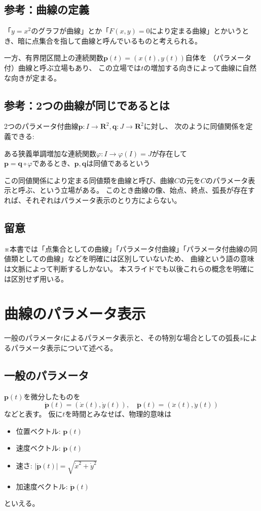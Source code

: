 \documentclass[a4j,disablejfam,dvipdfmx,papersize,slide,uplatex,21pt]{jsarticle}
\begin{document}
\newpage
\subsection*{参考：曲線の定義}
「$y=x^2$のグラフが曲線」とか「$F(x,y)=0$により定まる曲線」とかいうとき、暗に点集合を指して曲線と呼んでいるものと考えられる。

一方、有界閉区間上の連続関数$\bm{p}(t) = (x(t), y(t))$自体を
（パラメータ付）曲線と呼ぶ立場もあり\cite{kaiseki1}、
この立場では$t$の増加する向きによって曲線に自然な向きが定まる。

\newpage
\subsection*{参考：2つの曲線が同じであるとは}
2つのパラメータ付曲線$\bm{p}: I \rightarrow \mathbf{R}^2, \bm{q}: J \rightarrow \mathbf{R}^2$に対し、
次のように同値関係を定義できる:
\begin{center}
    ある狭義単調増加な連続関数$\varphi: I \rightarrow \varphi(I) = J$が存在して\\
    $\bm{p} = \bm{q} \circ \varphi$であるとき、$\bm{p}, \bm{q}$は同値であるという
\end{center}
この同値関係により定まる同値類を曲線と呼び、曲線$C$の元を$C$のパラメータ表示と呼ぶ、という立場がある\cite{kaiseki1}。
このとき曲線の像、始点、終点、弧長が存在すれば、それぞれはパラメータ表示のとり方によらない。

\newpage
\subsection*{留意}
※本書では「点集合としての曲線」「パラメータ付曲線」「パラメータ付曲線の同値類としての曲線」などを明確には区別していないため、
曲線という語の意味は文脈によって判断するしかない。
本スライドでも以後これらの概念を明確には区別せず用いる。




\section{曲線のパラメータ表示}
一般のパラメータ$t$によるパラメータ表示と、その特別な場合としての弧長$s$によるパラメータ表示について述べる。

\newpage
\subsection*{一般のパラメータ}
$\bm{p}(t)$を微分したものを
\begin{equation}
    \dot{\bm{p}}(t) = (\dot{x}(t), \dot{y}(t)),\quad
    \ddot{\bm{p}}(t) = (\ddot{x}(t), \ddot{y}(t))
\end{equation}
などと表す。
仮に$t$を時間とみなせば、物理的意味は
\begin{itemize}
    \item 位置ベクトル: $\bm{p}(t)$
    \item 速度ベクトル: $\bm{\dot{p}}(t)$
    \item 速さ: $|\dot{\bm{p}}(t)| = \sqrt{\dot{x}^2 + \dot{y}^2}$
    \item 加速度ベクトル: $\bm{\ddot{p}}(t)$
\end{itemize}
といえる。
\end{document}
